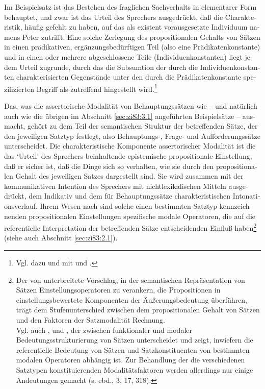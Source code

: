 \documentclass[output=paper]{langscibook}
\begin{document}
\begin{otherlanguage}{german}
Im Beispielsatz  ist das Bestehen des fraglichen Sachverhalts in elementarer Form behauptet, und zwar ist das Urteil des Sprechers ausgedrückt, daß die Charakteristik, häufig gefehlt zu haben, auf das als existent vorausgesetzte Individuum namens Peter zutrifft. Eine solche Zerlegung des propositionalen Gehalts von Sätzen in einen prädikativen, ergänzungsbedürftigen Teil (also eine Prädikatenkonstante) und in einen oder mehrere abgeschlossene Teile (Individuenkonstanten) liegt jedem Urteil zugrunde, durch das die Subsumtion der durch die Individuenkonstanten charakterisierten Gegenstände unter den durch die Prädikatenkonstante spezifizierten Begriff als zutreffend hingestellt wird.\footnote{Vgl. dazu \citet[35]{frege1891function-und-begriff.-vortrag-gehalten-in-der-sitzung-vom-9.-januar-1891-der-jenaischen-gesellschaft-fur-medizin-und-naturwissenschaft} und \citet[154 f.]{frege1914logik-in-der-mathematik} mit \citet[151 ff.]{katz1972semantic-theory} und \citet[59]{katz1977propositional-structure-and-illocutionary-force:-a-study-of-the-contribution-of-sentence-meaning-to-speech-acts}.}

Das, was die assertorische Modalität von Behauptungssätzen wie  -- und natürlich auch wie die übrigen im Abschnitt \ref{sec:zi83:3.1} angeführten Beispielsätze -- ausmacht, gehört zu dem Teil der semantischen Struktur der betreffenden Sätze, der den jeweiligen Satztyp festlegt, also Behauptungs-, Frage- und Aufforderungssätze unterscheidet. Die charakteristische Komponente assertorischer Modalität ist die das ‘Urteil’ des Sprechers beinhaltende epistemische propositionale Einstellung, daß er sicher ist, daß die Dinge sich so verhalten, wie sie durch den propositionalen Gehalt des jeweiligen Satzes dargestellt sind. Sie wird zusammen mit der kommunikativen Intention des Sprechers mit nichtlexikalischen Mitteln ausgedrückt, dem Indikativ und dem für Behauptungssätze charakteristischen Intonationsverlauf. Ihrem Wesen nach sind solche einen bestimmten Satztyp kennzeichnenden propositionalen Einstellungen spezifische modale Operatoren, die auf die referentielle Interpretation der betreffenden Sätze entscheidenden Einfluß haben\footnote{Der von \citet{lang1979zum-status-der-satzadverbiale} unterbreitete Vorschlag, in der semantischen Repräsentation von Sätzen Einstellungsoperatoren zu verankern, die Propositionen in einstellungsbewertete Komponenten der Äußerungsbedeutung überführen, trägt dem Stufenunterschied zwischen dem propositionalen Gehalt von Sätzen und den Faktoren der Satzmodalität Rechnung. \\ Vgl. auch \citet{bierwisch1979satztyp-und-kognitive-einstellung, Bierwisch80Semantic-structure}, \citet{Pasch82Illokutionare-Kraft} und \citet[Kap. 2 und 7]{jackendoff1972semantic-interpretation-in-generative-grammar.}, der zwi\-schen funktionaler und modaler Bedeutungsstrukturierung von Sätzen unterscheidet und zeigt, inwiefern die referentielle Bedeutung von Sätzen und Satzkonstituenten von bestimmten modalen Operatoren abhängig ist. Zur Behandlung der die verschiedenen Satztypen konstituierenden Modalitätsfaktoren werden allerdings nur einige Andeutungen gemacht (s. ebd., 3, 17, 318).} (siehe auch Abschnitt \ref{sec:zi83:2.1}).


\end{otherlanguage}
\end{document}

